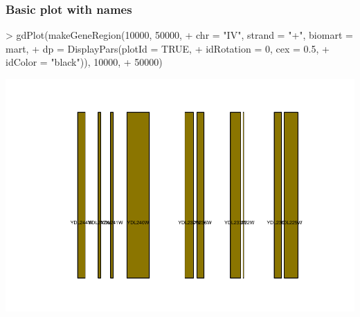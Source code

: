 \begin{frame}
  \frametitle{Basic plot with names}
\begin{Schunk}
\begin{Sinput}
> gdPlot(makeGeneRegion(10000, 50000, 
+     chr = "IV", strand = "+", biomart = mart, 
+     dp = DisplayPars(plotId = TRUE, 
+         idRotation = 0, cex = 0.5, 
+         idColor = "black")), 10000, 
+     50000)
\end{Sinput}
\end{Schunk}
\includegraphics{plots/fig-027}
\end{frame}


